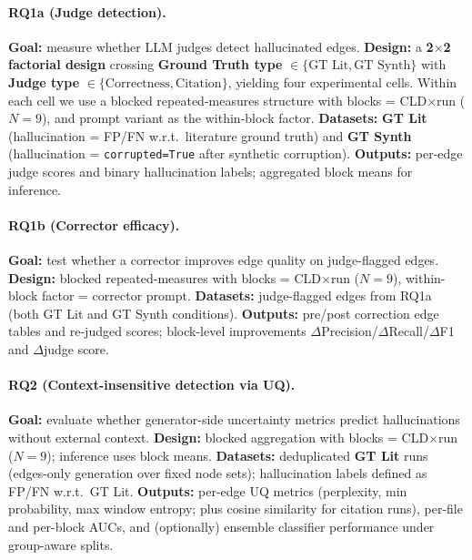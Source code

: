 \paragraph{RQ1a (Judge detection).}
\textbf{Goal:} measure whether LLM judges detect hallucinated edges.
\textbf{Design:} a \textbf{2$\times$2 factorial design} crossing \textbf{Ground Truth type} \(\in\{\text{GT Lit},\text{GT Synth}\}\) with \textbf{Judge type} \(\in\{\text{Correctness},\text{Citation}\}\), yielding four experimental cells. Within each cell we use a blocked repeated-measures structure with blocks = CLD$\times$run ($N=9$), and prompt variant as the within-block factor.
\textbf{Datasets:} \textbf{GT Lit} (hallucination = FP/FN w.r.t.\ literature ground truth) and \textbf{GT Synth} (hallucination = \texttt{corrupted=True} after synthetic corruption).
\textbf{Outputs:} per-edge judge scores and binary hallucination labels; aggregated block means for inference.

\paragraph{RQ1b (Corrector efficacy).}
\textbf{Goal:} test whether a corrector improves edge quality on judge-flagged edges.
\textbf{Design:} blocked repeated-measures with blocks = CLD$\times$run ($N=9$), within-block factor = corrector prompt.
\textbf{Datasets:} judge-flagged edges from RQ1a (both GT Lit and GT Synth conditions).
\textbf{Outputs:} pre/post correction edge tables and re-judged scores; block-level improvements \(\Delta\)Precision/\(\Delta\)Recall/\(\Delta\)F1 and \(\Delta\)judge score.

\paragraph{RQ2 (Context-insensitive detection via UQ).}
\textbf{Goal:} evaluate whether generator-side uncertainty metrics predict hallucinations without external context.
\textbf{Design:} blocked aggregation with blocks = CLD$\times$run ($N=9$); inference uses block means.
\textbf{Datasets:} deduplicated \textbf{GT Lit} runs (edges-only generation over fixed node sets); hallucination labels defined as FP/FN w.r.t.\ GT Lit.
\textbf{Outputs:} per-edge UQ metrics (perplexity, min probability, max window entropy; plus cosine similarity for citation runs), per-file and per-block AUCs, and (optionally) ensemble classifier performance under group-aware splits.

